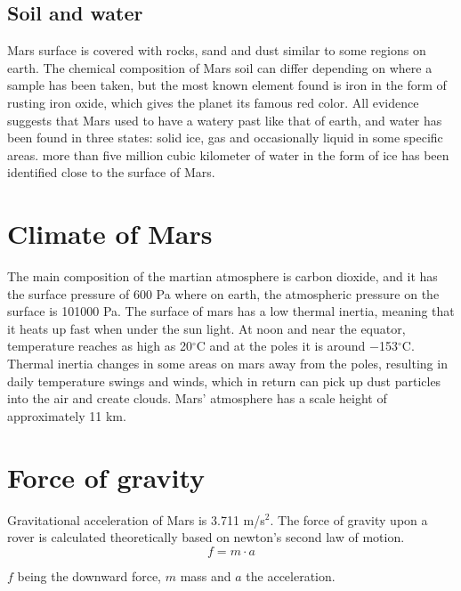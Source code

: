 \subsection{Soil and water }
Mars surface is covered with rocks, sand and dust similar to some regions on earth. %
The chemical composition of Mars soil can differ depending on where a sample has been taken, but the most known element found is iron in the form of rusting iron oxide, which gives the planet its famous red color.
\newline All evidence suggests that Mars used to have a watery past like that of earth, and water has been found in three states: solid ice, gas and occasionally liquid in some specific areas\cite{liquid}.
more than five million cubic kilometer of water in the form of ice  has been identified close to the surface of Mars\cite{water}.



\section{Climate of Mars}
The main composition of the martian atmosphere is carbon dioxide, and it has the surface pressure of 600 Pa where on earth, the atmospheric pressure on the surface is 101000 Pa.
\newline The surface of mars has a low thermal inertia, meaning that it heats up fast when under the sun light. At noon and near the equator, temperature reaches as high as 20$^{\circ}$C and at the poles it is around −153$^{\circ}$C. Thermal inertia changes in some areas on mars away from the poles, resulting in daily temperature swings and winds, which in return can pick up dust particles into the air and create clouds. Mars' atmosphere has a scale height of approximately 11 km\cite{climate}.


\newpage
\section{Force of gravity}
Gravitational acceleration of Mars is 3.711 m/s$^2$. The force of gravity upon a rover is calculated theoretically based on newton's second law of motion.
\begin{equation}\label{ch:newtons_second_law}
   f=m \cdot a 
\end{equation}


$f$ being the downward force, $m$ mass and $a$ the acceleration.

